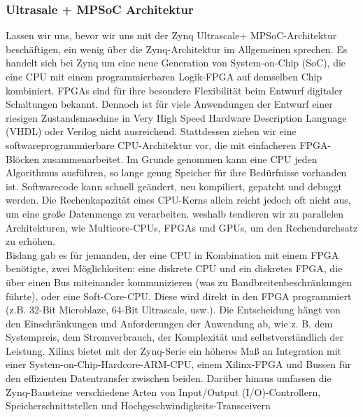 \subsubsection{Ultrasale + MPSoC Architektur}
Lassen wir uns, bevor wir uns mit der Zynq Ultrascale+ MPSoC-Architektur beschäftigen, ein wenig über die Zynq-Architektur im Allgemeinen sprechen. Es handelt sich bei Zynq um eine neue Generation von System-on-Chip (SoC), die eine CPU mit einem programmierbaren Logik-FPGA auf demselben Chip kombiniert.
FPGAs sind für ihre besondere Flexibilität beim Entwurf digitaler Schaltungen bekannt. Dennoch ist für viele Anwendungen der Entwurf einer riesigen Zustandsmaschine in Very High Speed Hardware Description Language (VHDL) oder Verilog nicht ausreichend. Stattdessen ziehen wir eine softwareprogrammierbare CPU-Architektur vor, die mit einfacheren FPGA-Blöcken zusammenarbeitet. Im Grunde genommen kann eine CPU jeden Algorithmus ausführen, so lange genug Speicher für ihre Bedürfnisse vorhanden ist. Softwarecode kann schnell geändert, neu kompiliert, gepatcht und debuggt werden. Die Rechenkapazität eines CPU-Kerns allein reicht jedoch oft nicht aus, um eine große Datenmenge zu verarbeiten. weshalb tendieren wir zu parallelen Architekturen, wie Multicore-CPUs, FPGAs und GPUs, um den Rechendurchsatz zu erhöhen.\\

Bislang gab es für jemanden, der eine CPU in Kombination mit einem FPGA benötigte, zwei Möglichkeiten: eine diskrete CPU und ein diskretes FPGA, die über einen Bus miteinander kommunizieren (was zu Bandbreitenbeschränkungen führte), oder eine Soft-Core-CPU. Diese wird direkt in den FPGA programmiert (z.B. 32-Bit Microblaze, 64-Bit Ultrascale, usw.). Die Entscheidung hängt von den Einschränkungen und Anforderungen der Anwendung ab, wie z. B. dem Systempreis, dem Stromverbrauch, der Komplexität und selbstverständlich der Leistung. Xilinx bietet mit der Zynq-Serie ein höheres Maß an Integration mit einer System-on-Chip-Hardcore-ARM-CPU, einem Xilinx-FPGA und Bussen für den effizienten Datentransfer zwischen beiden. Darüber hinaus umfassen die Zynq-Bausteine verschiedene Arten von Input/Output (I/O)-Controllern, Speicherschnittstellen und Hochgeschwindigkeits-Transceivern

